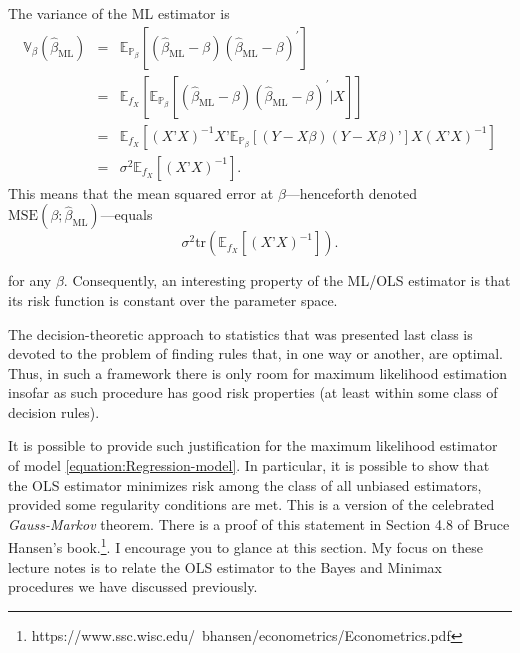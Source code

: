 \documentclass[11pt]{article} %
\begin{document}
The variance of the ML estimator is 
\begin{eqnarray*} \mathbb{V}_{\beta} (\widehat{\beta}_{\textrm{ML}}) &=&  \mathbb{E}_{\mathbb{P}_{\beta}} [ (\widehat{\beta}_{\textrm{ML}}-\beta) (\widehat{\beta}_{\textrm{ML}} -\beta )^{\prime}  ] \\
&=&  \mathbb{E}_{f_{X}} \left[  \mathbb{E}_{\mathbb{P}_{\beta}} [ (\widehat{\beta}_{\textrm{ML}}-\beta) (\widehat{\beta}_{\textrm{ML}} -\beta )^{\prime}  | X  ]  \right] \\
&=&  \mathbb{E}_{f_{X}} \left[  (X’X)^{-1} X’ \mathbb{E}_{\mathbb{P}_{\beta}} [ (Y-X\beta) (Y-X\beta)’] X (X’X)^{-1} \right] \\
&=& \sigma^2 \mathbb{E}_{f_{X}} \left[ (X’X)^{-1} \right].  \label{equation:variance}
\end{eqnarray*}
This means that the mean squared error at $\beta$---henceforth denoted $\textrm{MSE}(\beta ; \widehat{\beta}_{\textrm{ML}})$---equals
\[ \sigma^2 \textrm{tr} \left (\mathbb{E}_{f_{X}} \left[ (X’X)^{-1} \right] \right). \] 

\noindent for any $\beta$. Consequently, an interesting property of the ML/OLS estimator is that its risk function is constant over the parameter space.  

The decision-theoretic approach to statistics that was presented last class is devoted to the problem of finding rules that, in one way or another, are optimal. Thus, in such a framework there is only room for maximum likelihood estimation insofar as such procedure has good risk properties (at least within some class of decision rules). 

It is possible to provide such justification for the maximum likelihood estimator of model \eqref{equation:Regression-model}. In particular, it is possible to show that the OLS estimator minimizes risk among the class of all unbiased estimators, provided some regularity conditions are met. This is a version of the celebrated \emph{Gauss-Markov} theorem. There is a proof of this statement in Section 4.8 of Bruce Hansen's book.\footnote{https://www.ssc.wisc.edu/~bhansen/econometrics/Econometrics.pdf}. I encourage you to glance at this section. My focus on these lecture notes is to relate the OLS estimator to the Bayes and Minimax procedures we have discussed previously. 

\newpage
\end{document}
